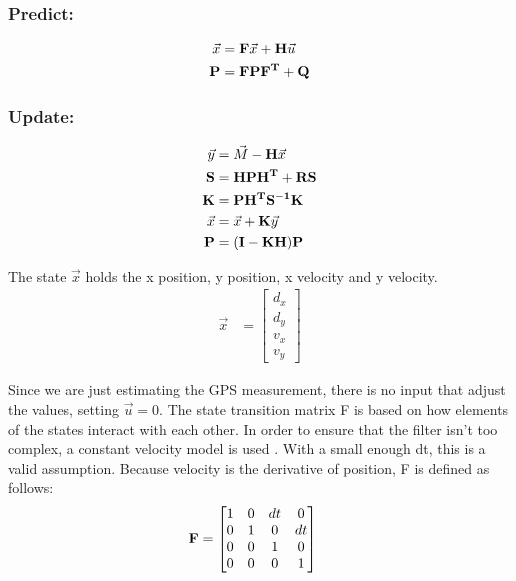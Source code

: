  \subsubsection*{Predict:}
\begin{align}
    \vec{x} &= \mathbf{F}\vec{x} + \mathbf{H}\vec{u} \label{eq:state_predict}\\ 
    \mathbf{P} &= \mathbf{F}\mathbf{P}\mathbf{F^T} + \mathbf{Q} \label{eq:var_predict}
\end{align}
\subsubsection*{Update:}
\begin{align}
    \vec{y} &= \vec{M} - \mathbf{H}\vec{x} \label{eq:innovation_up}\\
    \mathbf{S}&= \mathbf{HPH^T+RS} \label{eq:inter_up}\\
    \mathbf{K} &= \mathbf{PH^TS^{-1}K} \label{eq:kalgain_up}\\
    \vec{x} &= \vec{x} + \mathbf{K}\vec{y} \label{eq:state_up}\\
    \mathbf{P} &= \mathbf{(I-KH)P} \label{eq:var_up}
\end{align} \par
The state $\vec{x}$ holds the x position, y position, x velocity and y velocity. \\
\begin{align}
	\vec{x} &= \begin{bmatrix}
				d_x \\
				d_y\\
				v_x\\
				v_y
				\end{bmatrix}
\end{align}\par
Since we are just estimating the GPS measurement, there is no input that adjust the values, setting $\vec{u} = 0$. The state transition matrix F is based on how elements of the states interact with each other. In order to ensure that the filter isn't too complex, a constant velocity model is used \cite{kf_book}. With a small enough dt, this is a valid assumption. Because velocity is the derivative of position, F is defined as follows: 
\begin{align}
	\mathbf{F} &= \begin{bmatrix}
					1 & 0 & dt & 0 \\
					0 & 1 & 0 & dt \\
					0 & 0 & 1 & 0 \\
					0 & 0 & 0 & 1
				\end{bmatrix}
\end{align} \par
